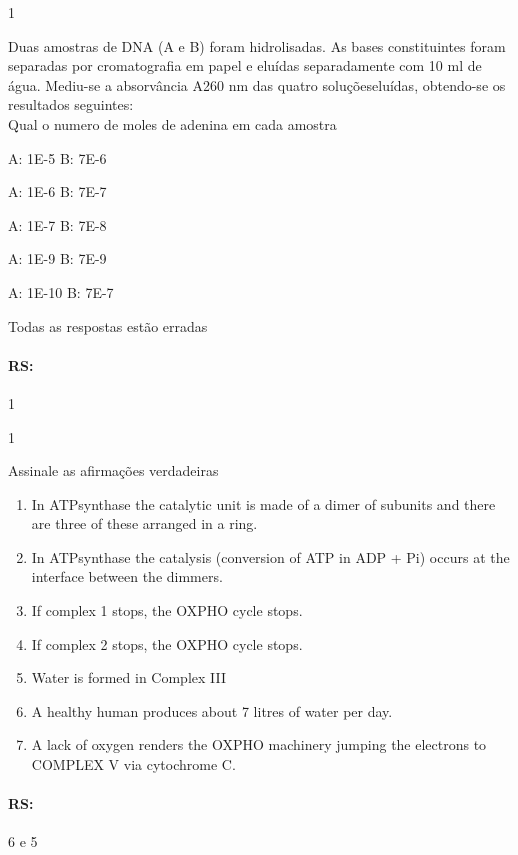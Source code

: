 \documentclass[\mainfilename]{subfiles}
\begin{document}
\begin{questionBox}1{}
    
    Duas amostras de DNA (A e B) foram hidrolisadas. As bases constituintes foram separadas por cromatografia em papel e eluídas separadamente com 10 ml de água. Mediu-se a absorvância A260 nm das quatro soluçõeseluídas, obtendo-se os resultados seguintes:\\
    
    Qual o numero de moles de adenina em cada amostra
    \begin{enumerate}
        \begin{multicols}{2}
            \item A: 1E-5 B: 7E-6
            \item A: 1E-6 B: 7E-7 
            \item A: 1E-7 B: 7E-8 
            \item A: 1E-9 B: 7E-9
            \item A: 1E-10 B: 7E-7
            \item Todas as respostas estão erradas
        \end{multicols}
    \end{enumerate}

    \paragraph{RS:} 1
    
\end{questionBox}

\begin{questionBox}1{}
    
    Assinale as afirmações verdadeiras
    \begin{enumerate}
        \item In ATPsynthase the catalytic unit is made of a dimer of subunits and there are three of these arranged in a ring.
        \item In ATPsynthase the catalysis (conversion of ATP in ADP + Pi) occurs at the interface between the dimmers.
        \item If complex 1 stops, the OXPHO cycle stops.
        \item If complex 2 stops, the OXPHO cycle stops.
        \item Water is formed in Complex III
        \item A healthy human produces about 7 litres of water per day.
        \item A lack of oxygen renders the OXPHO machinery jumping the electrons to COMPLEX V via cytochrome C.
    \end{enumerate}

    \paragraph{RS:} 6 e 5
    
\end{questionBox}
\end{document}
